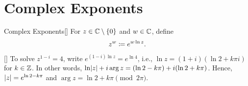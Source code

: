 \documentclass[../complex_variables_1.tex]{subfiles}
\begin{document}
\section{Complex Exponents}

\begin{Definition}{Complex Exponents}[]
    For \(z \in \CC \setminus \{0\}\) and \(w \in \CC\), define
    \[
        z^w \coloneqq e^{w \ln z}\text.
    \]
\end{Definition}

\begin{Example}{}[]
    To solve \(z^{1-i} = 4\), write \(e^{(1-i)\ln z} = e^{\ln 4}\),
    i.e., \(\ln z = (1+i)(\ln 2 + k\pi i)\) for \(k \in \ZZ\).
    In other words, \(\ln \lvert z\rvert + i \arg z = (\ln 2 - k\pi) + i(\ln 2 +k\pi)\).
    Hence, \(\lvert z\rvert = e^{\ln 2 - k\pi}\) and \(\arg z = \ln 2 + k\pi \pmod{2\pi}\).
\end{Example}
\end{document}
